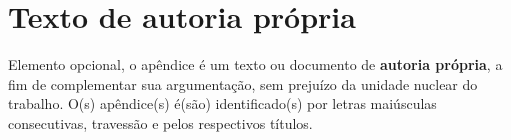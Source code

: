 \apendices

\chapter{Texto de autoria própria}

Elemento opcional, o apêndice é um texto ou documento de \textbf{autoria própria}, a fim de complementar sua argumentação, sem prejuízo da unidade nuclear do trabalho. O(s) apêndice(s) é(são) identificado(s) por letras maiúsculas consecutivas, travessão e pelos respectivos títulos.
